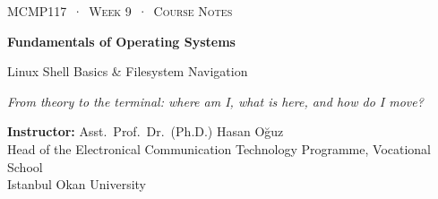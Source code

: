 \documentclass[11pt,a4paper]{article}
\begin{document}
\newcommand{\outl}[3]{\Needspace{5\baselineskip}}
\newcommand{\tl}{\textasciitilde}
\sloppy

\thispagestyle{empty}
\begin{tcolorbox}[enhanced,colback=dark,colframe=dark,arc=0pt,boxrule=0pt,
  left=18pt,right=18pt,top=20pt,bottom=20pt,coltext=white]
{\small\color{mint}\textsc{MCMP117 \,·\, Week 9 \,·\, Course Notes}}\par\medskip
{\headfont\fontsize{26}{30}\selectfont\bfseries Fundamentals of Operating Systems}\par\medskip
{\large Linux Shell Basics \& Filesystem Navigation}\par\smallskip
{\small\itshape\color{white!70} From theory to the terminal: where am I, what is here, and how do I move?}
\end{tcolorbox}

\vspace{0.4em}
{\small
\textbf{Instructor:} Asst.\ Prof.\ Dr.\ (Ph.D.) Hasan Oğuz\\
Head of the Electronical Communication Technology Programme, Vocational School\\
Istanbul Okan University\par}
\end{document}
